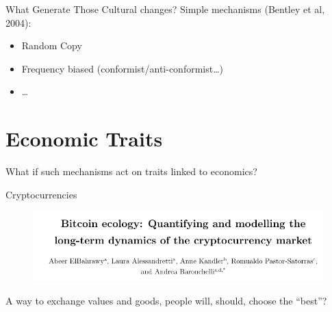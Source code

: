 \documentclass[12pt, notes=show]{beamer}
\begin{document}
\begin{frame}{What Generate Those Cultural changes?}
	Simple mechanisms (Bentley et al, 2004):
	\begin{itemize}
		\item<2->Random Copy 
		\item<3-> Frequency biased (conformist/anti-conformist\dots)
		\item<4->\dots	
	\end{itemize}
\end{frame}

\section{Economic Traits}


\begin{frame}
	\begin{center}
	    What if such mechanisms act on traits linked to economics?
	\end{center}
\end{frame}

\begin{frame}{Cryptocurrencies}
    \begin{figure}
	\includegraphics[width=\textwidth]{images/btccultevoabstract.png}\\
    \end{figure}

    A way to exchange values and goods, people will, should, choose the ``best''?
\end{frame}
\end{document}
